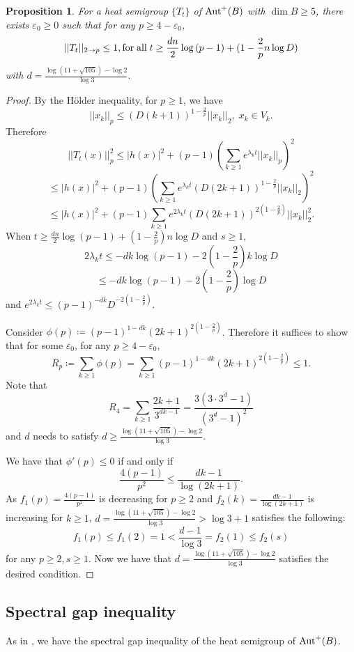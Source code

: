 \documentclass[12pt]{amsart}
\theoremstyle{plain} %
\newtheorem{proposition}[equation]{Proposition}
\theoremstyle{definition}
\theoremstyle{remark}
\begin{document}
  
 \begin{proposition}
 For a heat semigroup $\{T_t\}$ of ${\rm Aut}^+(B)$ with $\dim B\geq5$, there exists $\varepsilon_0\geq0$ such that for any $p\geq4-\varepsilon_0$,
 \[||T_t||_{2\to p}\leq1, \text{for\;all}\;t\geq\frac{dn}{2}\log{(p-1)}+(1-\frac{2}{p}n\log D)\]
 with $d=\frac{\log(11+\sqrt{105})-\log2}{\log3}.$
 \end{proposition}
 
 \begin{proof}
 By the H\"older inequality, for $p\geq1$, we have
 \[||x_k||_p\leq(D(k+1))^{1-\frac{2}{p}}||x_k||_2, \;x_k\in V_k.\]
 Therefore
 \[||T_t(x)||_p^2\leq |h(x)|^2+(p-1)\left(\sum_{k\geq1} e^{\lambda_k t}||x_k||_p\right)^2\]
 \[\leq |h(x)|^2+(p-1)\left(\sum_{k\geq1} e^{\lambda_k t}(D(2k+1))^{1-\frac{2}{p}}||x_k||_2\right)^2\]
 \[\leq  |h(x)|^2+(p-1) \sum_{k\geq1} e^{2 \lambda_k t}(D(2k+1))^{2(1-\frac{2}{p})}||x_k||_2^2.\]
 When $t\geq \frac{dn}{2}\log{(p-1)}+(1-\frac{2}{p})n\log{D}$ and $s\geq1$, 
 \[2\lambda_kt\leq-dk\log{(p-1)}-2\left(1-\frac{2}{p}\right)k\log{D}\]
 \[\leq -dk\log{(p-1)}-2\left(1-\frac{2}{p}\right)\log{D}\]
 and $e^{2\lambda_kt}\leq (p-1)^{-dk}D^{-2(1-\frac{2}{p})}.$
 
Consider $\phi(p)\coloneqq (p-1)^{1-dk}(2k+1)^{2(1-\frac{2}{p})}$.
 Therefore it suffices to show that for some $\varepsilon_0$, for any $p\geq 4-\varepsilon_0$,
 \[R_p\coloneqq\sum_{k\geq1}\phi(p)=\sum_{k\geq1}(p-1)^{1-dk}(2k+1)^{2(1-\frac{2}{p})}\leq 1.\]
Note that 
 \[R_4=\sum_{k\geq1}\frac{2k+1}{3^{dk-1}}=\frac{3(3\cdot3^d-1)}{(3^d-1)^2}\]
 and $d$ needs to satisfy $d\geq \frac{\log(11+\sqrt{105})-\log2}{\log3}$.
 
We have that $\phi'(p)\leq0$ if and only if
\[\frac{4(p-1)}{p^2}\leq\frac{dk-1}{\log{(2k+1)}}.\]
As $f_1(p)=\frac{4(p-1)}{p^2}$ 
is decreasing for $p\geq2$ and $f_2(k)=\frac{dk-1}{\log{(2k+1)}}$
 is increasing for 
 $k\geq1$, $d=\frac{\log(11+\sqrt{105})-\log2}{\log3}>\log{3}+1$ satisfies the following:
\[f_1(p)\leq f_1(2)=1<\frac{d-1}{\log{3}}=f_2(1)\leq f_2(s)\]
for any $p\geq2, s\geq1$.
Now we have that $d =\frac{\log(11+\sqrt{105})-\log2}{\log3}$ satisfies the desired condition.
 \end{proof}

\subsection{Spectral gap inequality}
 
 As in \cite[Sectoin 3]{FHLUZ}, we have the spectral gap inequality of the heat semigroup of ${\rm Aut}^+(B)$. 
 
\end{document}
